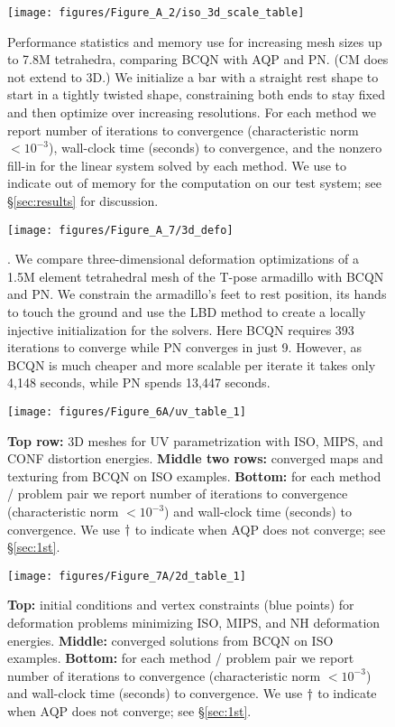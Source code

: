 \begin{figure}[h!]
\vspace{3mm}
\centering
\texttt{[image: figures/Figure\_A\_2/iso\_3d\_scale\_table]}
\caption{ Performance statistics and memory use for increasing
mesh sizes up to 7.8M tetrahedra, comparing BCQN with AQP
and PN. (CM does not extend to 3D.) We initialize a bar with a
straight rest shape to start in a tightly twisted shape, constraining
both ends to stay fixed and then optimize over increasing resolutions.
For each method we report number of iterations to convergence
(characteristic norm $< 10^{-3}$), wall-clock time (seconds) to
convergence, and the nonzero fill-in for the linear system solved
by each method. We use \red{\bf*} to indicate out of memory for the
computation on our test system; see \S\ref{sec:results} for discussion.
}
\label{fig:3d_scale_table}
\end{figure}

\begin{figure}[h!]
\centering
\texttt{[image: figures/Figure\_A\_7/3d\_defo]}
\caption{. We compare three-dimensional
deformation optimizations of a 1.5M element tetrahedral mesh of the
T-pose armadillo with BCQN and PN. We constrain the armadillo's
feet to rest position, its hands to touch the ground and use the
LBD method to create a locally injective
initialization for the solvers. Here BCQN requires 393 iterations
to converge while PN converges in just 9. However, as BCQN is much
cheaper and more scalable per iterate it takes only 4,148 seconds,
while PN spends 13,447 seconds.}
\label{fig:3d_large_defo}
\end{figure}

\begin{figure}[h!]
\centering
\texttt{[image: figures/Figure\_6A/uv\_table\_1]}
\caption{ {\bf Top row:}  3D meshes  for
UV parametrization with ISO, MIPS, and CONF distortion energies.
{\bf Middle two rows:} converged maps and texturing from BCQN on
ISO examples. {\bf Bottom:} for each method / problem pair we report
number of iterations to convergence (characteristic norm $< 10^{-3}$)
and wall-clock time (seconds) to convergence. We use ${\bf \dagger}$
to indicate when AQP does not converge; see \S\ref{sec:1st}.}
\label{fig:uv_table}
\end{figure}

\begin{figure}[h!]
\centering
\texttt{[image: figures/Figure\_7A/2d\_table\_1]}
\caption{ {\bf Top:}  initial
conditions and vertex constraints (blue points) for deformation
problems minimizing ISO, MIPS, and NH deformation energies. {\bf
Middle:} converged solutions from BCQN on ISO examples. {\bf Bottom:}
for each method / problem pair we report number of iterations to
convergence (characteristic norm $< 10^{-3}$) and wall-clock time
(seconds) to convergence. We use ${\bf \dagger}$ to indicate when
AQP does not converge; see \S\ref{sec:1st}.}
\label{fig:2d_defo_table}
\end{figure}


